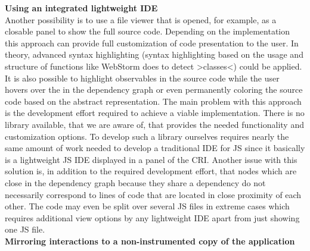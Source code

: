 \textbf{Using an integrated lightweight IDE}\\
Another possibility is to use a file viewer that is opened, for example, as a closable panel to show the full source code. Depending on the implementation this approach can provide full customization of code presentation to the user. In theory, advanced syntax highlighting (syntax highlighting based on the usage and structure of functions like WebStorm does to detect >classes<) could be applied. It is also possible to highlight observables in the source code while the user hovers over the in the dependency graph or even permanently coloring the source code based on the abstract representation. The main problem with this approach is the development effort required to achieve a viable implementation. There is no library available, that we are aware of, that provides the needed functionality and customization options. To develop such a library ourselves requires nearly the same amount of work needed to develop a traditional IDE for JS since it basically is a lightweight JS IDE displayed in a panel of the CRI. Another issue with this solution is, in addition to the required development effort, that nodes which are close in the dependency graph because they share a dependency do not necessarily correspond to lines of code that are located in close proximity of each other. The code may even be split over several JS files in extreme cases which requires additional view options by any lightweight IDE apart from just showing one JS file.\\
\textbf{Mirroring interactions to a non-instrumented copy of the application}\\

